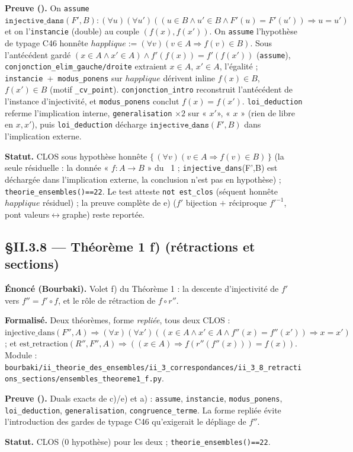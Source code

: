 \textbf{Preuve (\Nstar).} On \texttt{assume} $\texttt{injective\_dans}(F',B) : (\forall u)(\forall u')((u\in B \wedge u'\in B \wedge F'(u)=F'(u')) \Rightarrow u=u')$ et on l'\texttt{instancie} (double) au couple $(f(x), f(x'))$. On \texttt{assume} l'hypothèse de typage C46 honnête $happlique := (\forall v)(v\in A \Rightarrow f(v)\in B)$. Sous l'antécédent gardé $(x\in A \wedge x'\in A) \wedge f'(f(x))=f'(f(x'))$ (\texttt{assume}), \texttt{conjonction\_elim\_gauche/droite} extraient $x\in A$, $x'\in A$, l'égalité ; \texttt{instancie}~+~\texttt{modus\_ponens} sur $happlique$ dérivent inline $f(x)\in B$, $f(x')\in B$ (motif \texttt{\_cv\_point}). \texttt{conjonction\_intro} reconstruit l'antécédent de l'instance d'injectivité, et \texttt{modus\_ponens} conclut $f(x)=f(x')$. \texttt{loi\_deduction} referme l'implication interne, \texttt{generalisation} $\times 2$ sur « $x' $», « $x$ » (rien de libre en $x, x'$), puis \texttt{loi\_deduction} décharge $\texttt{injective\_dans}(F',B)$ dans l'implication externe.

\textbf{Statut.} CLOS sous hypothèse honnête $\{\,(\forall v)(v\in A \Rightarrow f(v)\in B)\,\}$ (la seule résiduelle : la donnée « $f : A \to B$ » du \theoreme~1 ; \texttt{injective\_dans}(F',B) est déchargée dans l'implication externe, la conclusion n'est pas en hypothèse) ; \texttt{theorie\_ensembles()==22}. Le test atteste \texttt{not est\_clos} (séquent honnête $happlique$ résiduel) ; la preuve complète de e) ($f'$ bijection $+$ réciproque $f'^{-1}$, pont valeurs$\leftrightarrow$graphe) reste reportée.

\subsection{§II.3.8 --- Théorème 1 f) (rétractions et sections)}
\textbf{Énoncé (Bourbaki).} Volet f) du Théorème 1 : la descente d'injectivité de
$f'$ vers $f''=f'\circ f$, et le rôle de rétraction de $f\circ r''$.

\textbf{Formalisé.} Deux théorèmes, forme \emph{repliée}, tous deux CLOS :
$\mathrm{injective\_dans}(F'',A) \Rightarrow (\forall x)(\forall x')((x\in A \wedge x'\in A \wedge f''(x)=f''(x')) \Rightarrow x=x')$ ;
et $\mathrm{est\_retraction}(R'',F'',A) \Rightarrow ((x\in A) \Rightarrow f(r''(f''(x)))=f(x))$. \\
Module : \texttt{bourbaki/ii\_theorie\_des\_ensembles/ii\_3\_correspondances/ii\_3\_8\_retractions\_sections/ensembles\_theoreme1\_f.py}.

\textbf{Preuve (\Nstar).} Duals exacts de c)/e) et a) : \texttt{assume},
\texttt{instancie}, \texttt{modus\_ponens}, \texttt{loi\_deduction},
\texttt{generalisation}, \texttt{congruence\_terme}. La forme repliée évite
l'introduction des gardes de typage C46 qu'exigerait le dépliage de $f''$.

\textbf{Statut.} CLOS (0 hypothèse) pour les deux ; \texttt{theorie\_ensembles()==22}.
